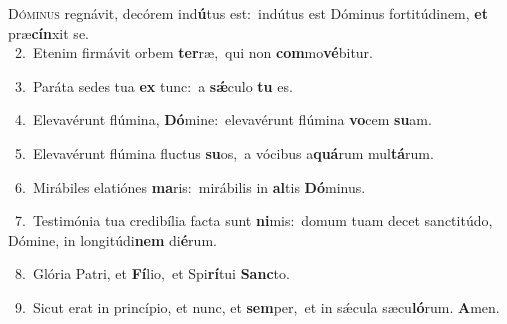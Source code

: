 \lettrine{\initial\textcolor{\initialcolor}{D}}{óminus} regnávit, decórem ind\-\textbf{ú}\-tus est:~\star indútus est Dóminus fortitúdinem, \textbf{et} præ\-\textbf{cín}\-xit se.\\
{\numbfont\textcolor{\numbcolor}{~2.}}~Etenim firmávit orbem \textbf{ter}\-ræ,~\star qui non \textbf{com}\-mo\-\textbf{vé}\-bitur.\par
{\numbfont\textcolor{\numbcolor}{~3.}}~Paráta sedes tua \textbf{ex} tunc:~\star a \textbf{sǽ}\-culo \textbf{tu} es.\par
{\numbfont\textcolor{\numbcolor}{~4.}}~Elevavérunt flúmina, \textbf{Dó}\-mine:~\star elevavérunt flúmina \textbf{vo}\-cem \textbf{su}\-am.\par
{\numbfont\textcolor{\numbcolor}{~5.}}~Elevavérunt flúmina fluctus \textbf{su}\-os,~\star a vócibus a\-\textbf{quá}\-rum mul\-\textbf{tá}\-rum.\par
{\numbfont\textcolor{\numbcolor}{~6.}}~Mirábiles elatiónes \textbf{ma}\-ris:~\star mirábilis in \textbf{al}\-tis \textbf{Dó}\-minus.\par
{\numbfont\textcolor{\numbcolor}{~7.}}~Testimónia tua credibília facta sunt \textbf{ni}\-mis:~\star domum tuam decet sanctitúdo, Dómine, in longitúdi\textbf{nem} di\-\textbf{é}\-rum.\par
{\numbfont\textcolor{\numbcolor}{~8.}}~Glória Patri, et \textbf{Fí}\-lio,~\star et Spi\-\textbf{rí}\-tui \textbf{Sanc}\-to.\par
{\numbfont\textcolor{\numbcolor}{~9.}}~Sicut erat in princípio, et nunc, et \textbf{sem}\-per,~\star et in sǽcula sæcu\-\textbf{ló}\-rum. \textbf{A}\-men.\par
